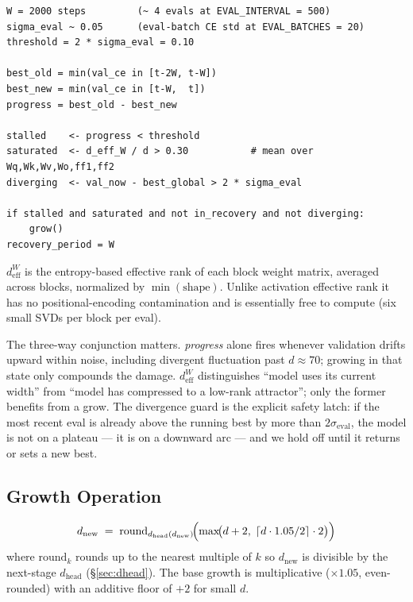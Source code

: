 \documentclass{article}
\newcommand{\deff}{d_{\mathrm{eff}}}
\begin{document}
\begin{lstlisting}
W = 2000 steps         (~ 4 evals at EVAL_INTERVAL = 500)
sigma_eval ~ 0.05      (eval-batch CE std at EVAL_BATCHES = 20)
threshold = 2 * sigma_eval = 0.10

best_old = min(val_ce in [t-2W, t-W])
best_new = min(val_ce in [t-W,  t])
progress = best_old - best_new

stalled    <- progress < threshold
saturated  <- d_eff_W / d > 0.30           # mean over Wq,Wk,Wv,Wo,ff1,ff2
diverging  <- val_now - best_global > 2 * sigma_eval

if stalled and saturated and not in_recovery and not diverging:
    grow()
recovery_period = W
\end{lstlisting}

$\deff^W$ is the entropy-based effective rank of each block weight matrix,
averaged across blocks, normalized by $\min(\mathrm{shape})$.  Unlike
activation effective rank it has no positional-encoding contamination and
is essentially free to compute (six small SVDs per block per eval).

The three-way conjunction matters.  \emph{progress} alone fires whenever
validation drifts upward within noise, including divergent fluctuation past
$d \approx 70$; growing in that state only compounds the damage.  $\deff^W$
distinguishes ``model uses its current width'' from ``model has compressed
to a low-rank attractor''; only the former benefits from a grow.  The
divergence guard is the explicit safety latch: if the most recent eval is
already above the running best by more than $2\sigma_{\text{eval}}$, the
model is not on a plateau --- it is on a downward arc --- and we hold off
until it returns or sets a new best.

\subsection{Growth Operation}
\label{sec:asymmetric-init}

\begin{equation}
d_{\text{new}} \;=\; \mathrm{round}_{d_{\text{head}}(d_{\text{new}})}\!\Bigl(
\max\!\bigl(d + 2,\; \lceil d \cdot 1.05 / 2\rceil \cdot 2\bigr)\Bigr)
\end{equation}
where $\mathrm{round}_k$ rounds up to the nearest multiple of $k$ so
$d_{\text{new}}$ is divisible by the next-stage $d_{\text{head}}$
(\S\ref{sec:dhead}).  The base growth is multiplicative
($\times 1.05$, even-rounded) with an additive floor of $+2$ for
small $d$.
\end{document}

